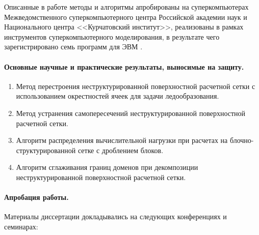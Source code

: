 \documentclass[a4paper,14pt]{extarticle}                     %
\numberwithin{equation}{section}                             %
\numberwithin{figure}{section}                               %
\numberwithin{table}{section}                                %
\theoremstyle{plain}                                         %
\numberwithin{theorem}{section}                              %
\numberwithin{lemma}{section}                                %
\numberwithin{definition}{section}                           %
\begin{document}
Описанные в работе методы и алгоритмы апробированы на суперкомпьютерах Межведомственного суперкомпьютерного центра Российской академии наук и Национального центра <<Курчатовский институт>>, реализованы в рамках инструментов суперкомпьютерного моделирования, в результате чего зарегистрировано семь программ для ЭВМ \cite{CertRybakov2019AVX,CertRybakov2020PrepStruct,CertGoryachev2020Crys,CertRybakov2021PrepUnstruct,CertRybakov2023Mon,CertGoryachev2023Crys,CertRybakov2024Surf}.

\paragraph{Основные научные и практические результаты, выносимые на защиту.}

\begin{enumerate}
\item Метод перестроения неструктурированной поверхностной расчетной сетки с использованием окрестностей ячеек для задачи ледообразования.
\item Метод устранения самопересечений неструктурированной поверхностной расчетной сетки.
\item Алгоритм распределения вычислительной нагрузки при расчетах на блочно-структурированной сетке с дроблением блоков.
\item Алгоритм сглаживания границ доменов при декомпозиции неструктурированной поверхностной расчетной сетки.
\end{enumerate}

\paragraph{Апробация работы.}

Материалы диссертации докладывались на следующих конференциях и семинарах:
\end{document}
